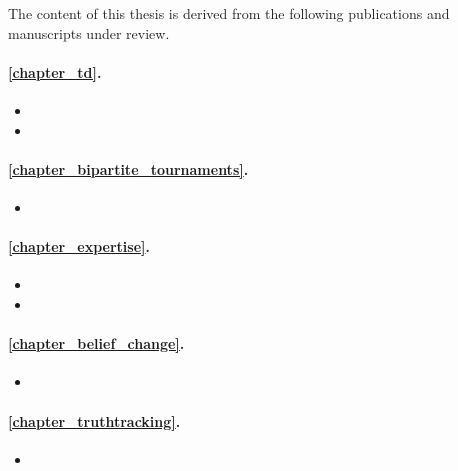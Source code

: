 The content of this thesis is derived from the following publications and
manuscripts under review.

\paragraph{\cref{chapter_td}.}
\begin{itemize}
    \item {}
    \item {}
\end{itemize}
\paragraph{\cref{chapter_bipartite_tournaments}.}
\begin{itemize}
    \item {}
\end{itemize}
\paragraph{\cref{chapter_expertise}.}
\begin{itemize}
    \item {}
    \item {}
\end{itemize}
\paragraph{\cref{chapter_belief_change}.}
\begin{itemize}
    \item {}
\end{itemize}
\paragraph{\cref{chapter_truthtracking}.}
\begin{itemize}
    \item {}
\end{itemize}
